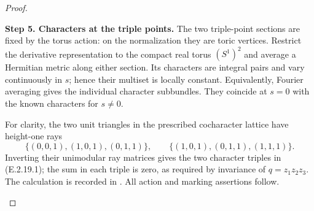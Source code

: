 \begin{proof}
\begin{enumerate}[label={$\langle1\rangle$\arabic*.},leftmargin=*]
\noindent\textbf{Step 5. Characters at the triple points.}
The two triple-point sections
are fixed by the torus action:
on the normalization they
are toric vertices.  Restrict
the derivative representation
to the compact real torus
$(S^1)^2$ and average a
Hermitian metric along either
section.  Its characters
are integral pairs and
vary continuously in $s$;
hence their multiset is
locally constant.  Equivalently,
Fourier averaging gives the
individual character
subbundles.  They coincide
at $s=0$ with the known
characters for $s\ne0$.

For clarity, the two unit
triangles in the prescribed
cocharacter lattice have
height-one rays
\[
 \{(0,0,1),(1,0,1),(0,1,1)\},
 \qquad
 \{(1,0,1),(0,1,1),(1,1,1)\}.
\]
Inverting their unimodular
ray matrices gives the two
character triples in
(E.2.19.1); the sum in
each triple is zero, as
required by invariance of
$q=z_1z_2z_3$.
The calculation is recorded
in .
All action and marking
assertions follow.

\end{enumerate}
\end{proof}

